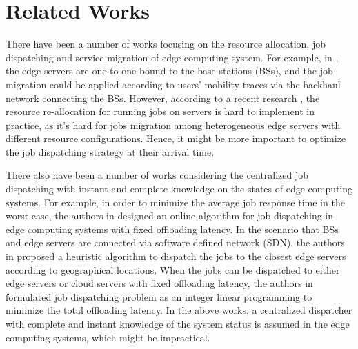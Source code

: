 \section{Related Works}
\label{sec:review}
There have been a number of works focusing on the resource allocation, job dispatching and service migration of edge computing system.
For example, in \cite{TON19-WangSq}, the edge servers are one-to-one bound to the base stations (BSs), and the job migration could be applied according to users' mobility traces via the backhaul network connecting the BSs.
However, according to a recent research \cite{INFOCOM19-WuC}, the resource re-allocation for running jobs on servers is hard to implement in practice, as it's hard for jobs migration among heterogeneous edge servers with different resource configurations.
Hence, it might be more important to optimize the job dispatching strategy at their arrival time.


There also have been a number of works considering the centralized job dispatching with instant and complete knowledge on the states of edge computing systems. For example, in order to minimize the average job response time in the worst case, the authors in \cite{tan-online} designed an online algorithm for job dispatching in edge computing systems with fixed offloading latency. In the scenario that BSs and edge servers are connected via software defined network (SDN), the authors in \cite{IOTJ18-FanQ} proposed a heuristic algorithm to dispatch the jobs to the closest edge servers according to geographical locations. When the jobs can be dispatched to either edge servers or cloud servers with fixed offloading latency, the authors in \cite{MASS18-MengZ} formulated job dispatching problem as an integer linear programming to minimize the total offloading latency.
In the above works, a centralized dispatcher with complete and instant knowledge of the system status is assumed in the edge computing systems, which might be impractical.

